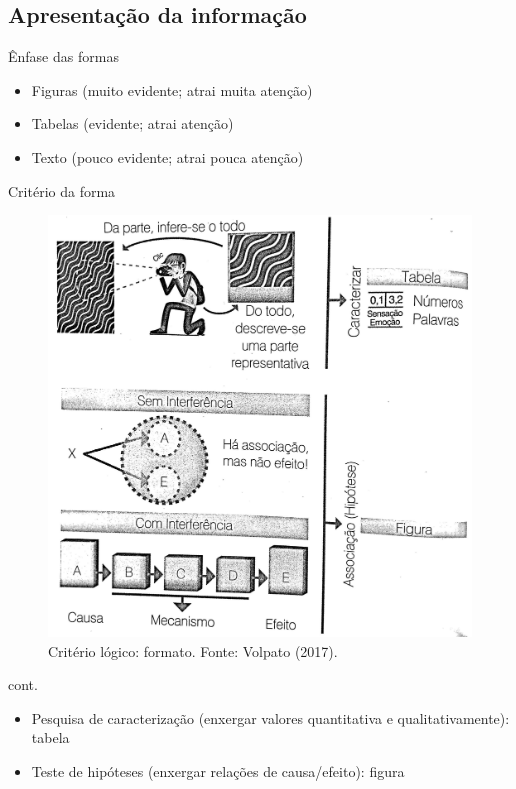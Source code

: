 \subsection{Apresentação da informação}

\begin{frame}{Ênfase das formas}
\begin{itemize}
\item Figuras (muito evidente; atrai muita atenção)
\item Tabelas (evidente; atrai atenção)
\item Texto (pouco evidente; atrai pouca atenção)
\end{itemize}
\end{frame}

\begin{frame}{Critério da forma}
\begin{figure}
\centering
\includegraphics[scale=0.08]{figs/07/criterio-forma}
\caption{Critério lógico: formato. Fonte: Volpato (2017).}
\end{figure}
\end{frame}

\begin{frame}{cont.}
\begin{itemize}
\item Pesquisa de caracterização (enxergar valores quantitativa e qualitativamente): tabela 
\item Teste de hipóteses (enxergar relações de causa/efeito): figura
\end{itemize}
\end{frame}


